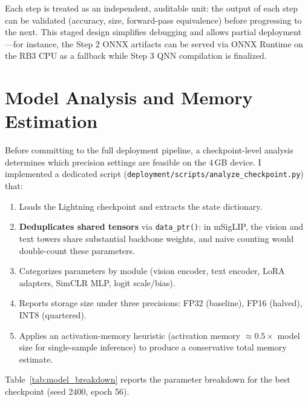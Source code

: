 \documentclass[../main.tex]{subfiles}
\begin{document}
\noindent Each step is treated as an independent, auditable unit: the output of each step can be validated (accuracy, size, forward-pass equivalence) before progressing to the next. This staged design simplifies debugging and allows partial deployment---for instance, the Step 2 ONNX artifacts can be served via ONNX Runtime on the RB3 CPU as a fallback while Step 3 QNN compilation is finalized.

\section{Model Analysis and Memory Estimation}
\label{sec:memory_analysis}

\noindent Before committing to the full deployment pipeline, a checkpoint-level analysis determines which precision settings are feasible on the 4\,GB device. I implemented a dedicated script (\texttt{deployment/scripts/analyze\_checkpoint.py}) that:

\begin{enumerate}
    \item Loads the Lightning checkpoint and extracts the state dictionary.
    \item \textbf{Deduplicates shared tensors} via \texttt{data\_ptr()}: in mSigLIP, the vision and text towers share substantial backbone weights, and naive counting would double-count these parameters.
    \item Categorizes parameters by module (vision encoder, text encoder, LoRA adapters, SimCLR MLP, logit scale/bias).
    \item Reports storage size under three precisions: FP32 (baseline), FP16 (halved), INT8 (quartered).
    \item Applies an activation-memory heuristic (activation memory $\approx 0.5 \times$ model size for single-sample inference) to produce a conservative total memory estimate.
\end{enumerate}

\noindent Table~\ref{tab:model_breakdown} reports the parameter breakdown for the best checkpoint (seed 2400, epoch 56).
\end{document}
